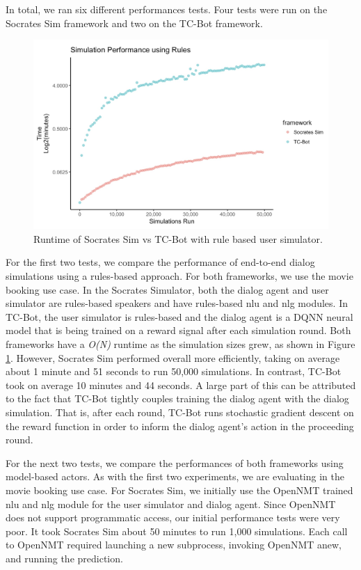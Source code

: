 In total, we ran six different performances tests. Four tests were run on the Socrates Sim framework and two on the TC-Bot framework. 
\begin{figure}[h!]
	\centering
	\label{fig:rules_test}
	\includegraphics[width=\linewidth]{diagrams/rules_perf_test.jpeg}
	\caption{ Runtime of Socrates Sim vs TC-Bot with rule based user simulator.}
\end{figure}

For the first two tests, we compare the performance of end-to-end dialog simulations using a rules-based approach. For both frameworks, we use the movie booking use case. In the Socrates Simulator, both the dialog agent and user simulator are rules-based speakers and have rules-based nlu and nlg modules. In TC-Bot, the user simulator is rules-based and the dialog agent is a DQNN neural model that is being trained on a reward signal after each simulation round.  Both frameworks have a \textit{O(N)} runtime as the simulation sizes grew, as shown in Figure \ref{fig:rules_test}. However, Socrates Sim performed overall more efficiently, taking on average about 1 minute and 51 seconds to run 50,000 simulations. In contrast, TC-Bot took on average 10 minutes and 44 seconds. A large part of this can be attributed to the fact that TC-Bot tightly couples training the dialog agent with the dialog simulation. That is, after each round, TC-Bot runs stochastic gradient descent on the reward function in order to inform the dialog agent's action in the proceeding round. 

For the next two tests, we compare the performances of both frameworks using model-based actors. As with the first two experiments, we are evaluating in the movie booking use case. For Socrates Sim, we initially use the OpenNMT trained nlu and nlg module for the user simulator and dialog agent. Since OpenNMT does not support programmatic access, our initial performance tests were very poor. It took Socrates Sim about 50 minutes to run 1,000 simulations. Each call to OpenNMT required launching a new subprocess, invoking OpenNMT anew, and running the prediction. 

